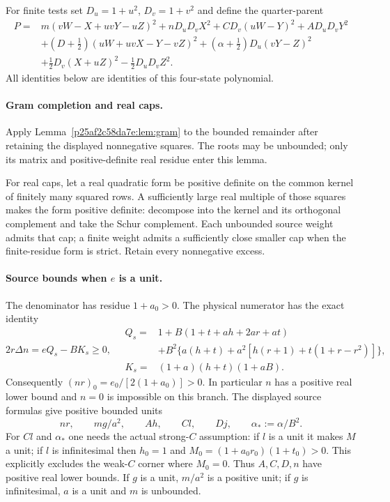 For finite tests set $D_u=1+u^2$, $D_v=1+v^2$ and define the quarter-parent
\begin{equation}
 \begin{split}
 P={}&m(vW-X+uvY-uZ)^2+nD_uD_vX^2+CD_v(uW-Y)^2+AD_uD_vY^2\\
 &+(D+\tfrac12)(uW+uvX-Y-vZ)^2
 +(\alpha+\tfrac12)D_u(vY-Z)^2\\
 &+\tfrac12D_v(X+uZ)^2-\tfrac12D_uD_vZ^2.
 \end{split}
 \label{eq:c2-ba-parent}
\end{equation}
All identities below are identities of this four-state polynomial.
\paragraph{Gram completion and real caps.}
Apply Lemma~\ref{p25af2c58da7e:lem:gram} to the bounded remainder after
retaining the displayed nonnegative squares. The roots may be unbounded;
only its matrix and positive-definite real residue enter this lemma.

For real caps, let a real quadratic form be positive definite on the
common kernel of finitely many squared rows. A sufficiently large real
multiple of those squares makes the form positive definite: decompose
into the kernel and its orthogonal complement and take the Schur
complement. Each unbounded source weight admits that cap; a finite weight
admits a sufficiently close smaller cap when the finite-residue form is
strict. Retain every nonnegative excess.

\paragraph{Source bounds when $e$ is a unit.}
The denominator has residue $1+a_0>0$. The physical numerator has the
exact identity
\begin{equation}
 2r\Delta n=eQ_s-BK_s\ge0,
 \quad
 \begin{aligned}
 Q_s={}&1+B(1+t+ah+2ar+at)\\
       &+B^2\{a(h+t)+a^2[h(r+1)+t(1+r-r^2)]\},\\
 K_s={}&(1+a)(h+t)(1+aB).
 \end{aligned}
 \label{eq:c2-ba-physical}
\end{equation}
Consequently $(nr)_0=e_0/[2(1+a_0)]>0$. In particular $n$ has a
positive real lower bound and $n=0$ is impossible on this branch.
The displayed source formulas give positive bounded units
\begin{equation}
 nr,\qquad mg/a^2,\qquad Ah,\qquad Cl,\qquad Dj,
 \qquad \alpha_*:=\alpha/B^2.
 \label{eq:c2-ba-unit-products}
\end{equation}
For $Cl$ and $\alpha_*$ one needs the actual strong-$C$ assumption:
if $l$ is a unit it makes $M$ a unit; if $l$ is infinitesimal then
$h_0=1$ and $M_0=(1+a_0r_0)(1+t_0)>0$. This explicitly excludes the
weak-$C$ corner where $M_0=0$. Thus $A,C,D,n$ have positive real
lower bounds. If $g$ is a unit, $m/a^2$ is a positive unit; if $g$ is
infinitesimal, $a$ is a unit and $m$ is unbounded.

